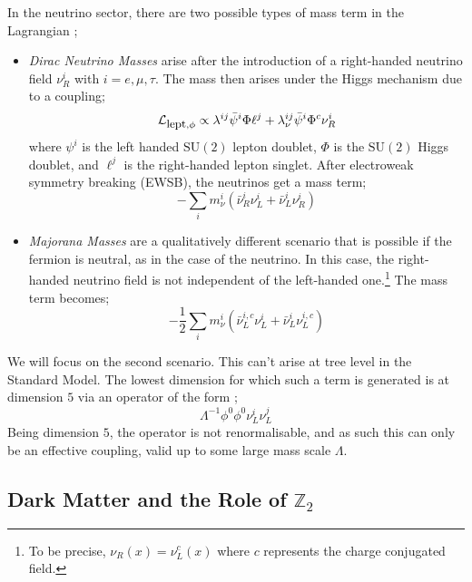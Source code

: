 \documentclass[11pt]{article}
\numberwithin{equation}{section}
\numberwithin{figure}{section}
\numberwithin{table}{section}
\newcommand{\mL}{\mathcal{L}}
\newcommand{\SU}[1]{\textrm{SU}\left(#1\right)}
\begin{document}
In the neutrino sector, there are two possible types of mass term in the Lagrangian \cite{Ma1998, Bellini2018, Boehm2006, Yao2018};
\begin{itemize}
  \item \textit{Dirac Neutrino Masses} arise after the introduction of a right-handed neutrino field $\nu^i_R$ with $i = e, \mu, \tau$. The mass then arises under the Higgs mechanism due to a coupling;
  \begin{equation}
    \mL_{\textrm{\small lept}, \phi} \propto \lambda^{ij}\bar{\psi}^i\Phi\ell^j + \lambda_\nu^{ij}\bar{\psi}^i\Phi^c \nu^i_R
  \end{equation}
  where $\psi^i$ is the left handed $\SU{2}$ lepton doublet, $\Phi$ is the $\SU{2}$ Higgs doublet, and $\ell^j$ is the right-handed lepton singlet. After electroweak symmetry breaking (EWSB), the neutrinos get a mass term;
  \begin{equation}
    -\sum_{i}{m_\nu^i \left(\bar{\nu}^i_R \nu^i_L + \bar{\nu}^i_L \nu^i_R\right)}
  \end{equation}
  \item \textit{Majorana Masses} are a qualitatively different scenario that is possible if the fermion is neutral, as in the case of the neutrino. In this case, the right-handed neutrino field is not independent of the left-handed one.\footnote{To be precise, $\nu_R(x) =
  \nu_L^c(x)$ where $c$ represents the charge conjugated field.} The mass term becomes;
  \begin{equation}\label{eq:Majorana Mass Term}
    -\frac{1}{2}\sum_{i}{m_\nu^i \left(\bar{\nu}_L^{i,c}\nu_L^i + \bar{\nu}^i_L \nu^{i, c}_L\right)}
  \end{equation}
\end{itemize}
We will focus on the second scenario. This can't arise at tree level in the Standard Model. The lowest dimension for which such a term is generated is at dimension $5$ via an operator of the form \cite{Bonnet2012};
\begin{equation}
  \Lambda^{-1}\phi^0 \phi^0 \nu^i_L \nu^j_L
\end{equation}
Being dimension $5$, the operator is not renormalisable, and as such this can only be an effective coupling, valid up to some large mass scale $\Lambda$.




\subsection{Dark Matter and the Role of $\mathbb{Z}_2$}\label{sec:understanding Z2}
\end{document}
